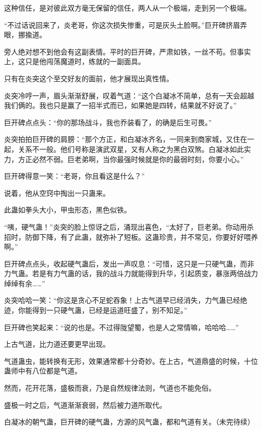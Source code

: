 \begin{this_body}
这种信任，是对彼此双方毫无保留的信任，两人从一个极端，走到另一个极端。

“不过话说回来了，炎老哥，你这次损失惨重，可是灰头土脸啊。”巨开碑挤眉弄眼，挪揄道。

旁人绝对想不到他会有这副表情。平时的巨开碑，严肃如铁，一丝不苟。但事实上，这只是他闯荡魔道时，练就的一副面具。

只有在炎突这个至交好友的面前，他才展现出真性情。

炎突冷哼一声，眉头渐渐舒展，叹着气道：“这个白凝冰不简单，总有一天会超越我们俩的。我也只是赢了一招半式而已，如果她是四转，结果就不好说了。”

巨开碑点点头：“你的那场战斗，我也乔装看了，的确是后生可畏。”

炎突拍拍巨开碑的肩膀：“那个方正，和白凝冰齐名，一同来到商家城，又住在一起，关系不一般。他们号称是演武双星，又有人称之为黑白双煞。白凝冰如此实力，方正必然不弱。巨老弟啊，当你最强时候就是你的最弱时刻，你要小心。”

巨开碑得意一笑：“老哥，你且看这是什么？”

说着，他从空窍中掏出一只蛊来。

此蛊如拳头大小，甲虫形态，黑色似铁。

“咦，硬气蛊！”炎突的脸上惊讶之后，涌现出喜色，“太好了，巨老弟。你动用杀招时，防御下降，有了此蛊，就弥补了短板。这蛊珍贵，并不常见，你要好好喂养啊。”

巨开碑点点头，收起硬气蛊后，发出一声叹息：“可惜，这只是一只硬气蛊，而非力气蛊。若是有力气蛊的话，我的战斗力就能得到升华，引起质变，暴涨两倍战力绰绰有余……”

炎突哈哈一笑：“你这是贪心不足蛇吞象！上古气道早已经消失，力气蛊已经绝迹，你能得到一只硬气蛊，已经是运道旺盛了，别不知足。”

巨开碑也笑起来：“说的也是。不过得陇望蜀，也是人之常情嘛，哈哈哈……”

上古气道，比力道还要更早出现。

气道蛊虫，能转换有无形，效果通常都十分奇妙。在上古，气道鼎盛的时候，十位蛊师中有八位都是气道。

然而，花开花落，盛极而衰，乃是自然规律法则，气道也不能免俗。

盛极一时之后，气道渐渐衰弱，然后被力道所取代。

白凝冰的朝气蛊，巨开碑的硬气蛊，方源的风气蛊，都和气道有关。（未完待续）

\end{this_body}

